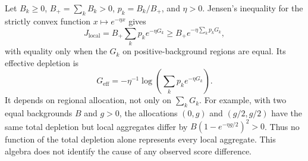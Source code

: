 \begin{remark}
\label{prop:regional_nonclosure}
Let $B_k\geq0$, $B_+=\sum_kB_k>0$, $p_k=B_k/B_+$, and $\eta>0$.
Jensen's inequality for the strictly convex function $x\mapsto e^{-\eta x}$
gives
\[
 J_{\mathrm{local}}=B_+\sum_kp_ke^{-\eta G_k}
 \geq B_+e^{-\eta\sum_kp_kG_k},
\]
with equality only when the $G_k$ on positive-background regions are equal.
Its effective depletion is
\begin{equation}\label{eq:effective_depletion}
 G_{\mathrm{eff}}=-\eta^{-1}\log\!\left(\sum_kp_ke^{-\eta G_k}\right).
\end{equation}
It depends on regional allocation, not only on $\sum_kG_k$.
For example, with two equal backgrounds $B$ and $g>0$, the allocations
$(0,g)$ and $(g/2,g/2)$ have the same total depletion but local aggregates
differ by $B(1-e^{-\eta g/2})^2>0$. Thus no function of the total depletion
alone represents every local aggregate. This algebra does not identify the
cause of any observed score difference.
\end{remark}
